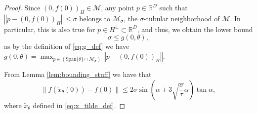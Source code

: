 \documentclass[12pt]{article}
\theoremstyle{remark}
\newcommand{\RR}{\mathbb{R}}
\newcommand{\MM}{\mathcal{M}}
\newcommand{\norm}[1]{\left\Vert #1 \right\Vert}
\newcommand{\wtilde}[1]{\widetilde{#1}}
\begin{document}
\begin{appendices}
\begin{proof}
    
    Since $(0,f(0))_H \in \MM$, any point $p\in \RR^D$ such that $\norm{p - (0,f(0))_H}\leq\sigma$ belongs to $\MM_\sigma$, the $\sigma$-tubular neighborhood of $\MM$. 
    In particular, this is also true for $p\in H^\perp\subset \RR^D$, and thus, we obtain the lower bound 
    \begin{equation*}
     \sigma \leq g(0,\theta)   
    ,\end{equation*}
    as by the definition of \eqref{eq:g_def} we have $g(0,\theta) = \max_{p\in (\textrm{Span}\{\theta\}\cap\MM_\sigma)} \norm{p - (0, f(0))_H}$.
    
    From Lemma \ref{lem:bounding_stuff} we have that 
    \[
    \|f(\wtilde{x}_\theta(0)) - f(0)\| \leq 2\sigma \sin (\alpha + 3\sqrt{\frac{\sigma}{\tau}}\alpha) \tan \alpha,
    \]
    where $\wtilde{x}_\theta$ defined in \eqref{eq:x_tilde_def}.
    

\end{proof}
\end{appendices}
\end{document}
